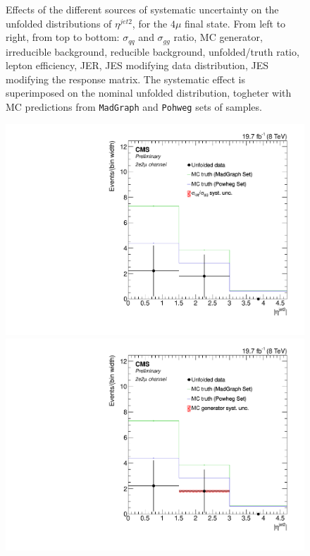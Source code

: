 \begin{figure}[hbtp]
\begin{center}
   \caption{Effects of the different sources of systematic uncertainty on the unfolded distributions of  $\eta^{jet2}$, for the     
   $4\mu$ final state. From left to right, from top to bottom: $\sigma_{qq}$ and $\sigma_{gg}$ ratio, MC generator, irreducible background, reducible background, unfolded/truth ratio, lepton efficiency, JER, JES modifying data distribution, JES modifying the response matrix. The systematic effect is superimposed on the nominal unfolded distribution, togheter with MC predictions from \texttt{MadGraph} and \texttt{Pohweg} sets of samples.}
   \label{fig:EtaJet2_syst_4m}
 \end{center}
\end{figure}

\begin{figure}[hbtp]
 \begin{center}
   \includegraphics[width=0.8\cmsFigWidth]{Figures/Unfolding/Systematics/ZZTo2e2m_EtaJet2_qqgg_Mad_fr}     
   \includegraphics[width=0.8\cmsFigWidth]{Figures/Unfolding/Systematics/ZZTo2e2m_EtaJet2_MCgen_Mad_fr}     

\end{center}
\end{figure}
